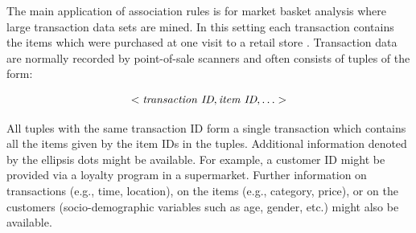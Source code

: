 \documentclass[10pt,a4paper]{article}
\begin{document}
The main application of association rules is for market basket analysis
where large transaction data sets are mined.  In this setting each
transaction contains the items which were purchased at one visit to a
retail store \citep[see e.g.,][]{arules:Berry+Linoff:1997}.
Transaction data are normally recorded by point-of-sale
scanners and often consists of tuples of the form:

\begin{displaymath}
<\emph{transaction ID}, \emph{item ID}, \ldots >
\end{displaymath}

All tuples with the same transaction ID form a single transaction which
contains all the items given by the item IDs in the tuples.  Additional
information denoted by the ellipsis dots might be available.  For
example, a customer ID might be provided via a loyalty program in a
supermarket.  Further information on transactions (e.g., time,
location), on the items (e.g., category, price), or on the customers
(socio-demographic variables such as age, gender, etc.) might also be
available.
\end{document}
